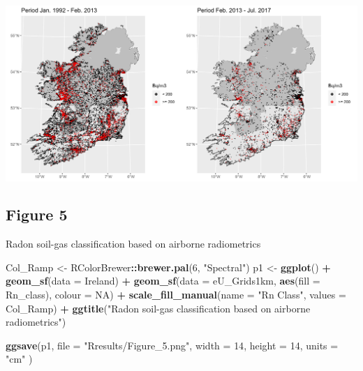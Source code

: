 \documentclass[
  12pt,
]{article}
\newenvironment{Shaded}{\begin{snugshade}}{\end{snugshade}}
\newcommand{\DataTypeTok}[1]{\textcolor[rgb]{0.13,0.29,0.53}{#1}}
\newcommand{\DecValTok}[1]{\textcolor[rgb]{0.00,0.00,0.81}{#1}}
\newcommand{\KeywordTok}[1]{\textcolor[rgb]{0.13,0.29,0.53}{\textbf{#1}}}
\newcommand{\NormalTok}[1]{#1}
\newcommand{\OperatorTok}[1]{\textcolor[rgb]{0.81,0.36,0.00}{\textbf{#1}}}
\newcommand{\OtherTok}[1]{\textcolor[rgb]{0.56,0.35,0.01}{#1}}
\newcommand{\StringTok}[1]{\textcolor[rgb]{0.31,0.60,0.02}{#1}}
\begin{document}
\begin{center}\includegraphics[width=0.85\linewidth]{Rresults/Figure_4} \end{center}

\hypertarget{figure-5}{%
\subsection{Figure 5}\label{figure-5}}

Radon soil-gas classification based on airborne radiometrics

\begin{Shaded}
\begin{Highlighting}[]
\NormalTok{  Col\_Ramp \textless{}{-}}\StringTok{ }\NormalTok{RColorBrewer}\OperatorTok{::}\KeywordTok{brewer.pal}\NormalTok{(}\DecValTok{6}\NormalTok{, }\StringTok{"Spectral"}\NormalTok{)}
\NormalTok{  p1 \textless{}{-}}\StringTok{ }\KeywordTok{ggplot}\NormalTok{() }\OperatorTok{+}\StringTok{ }
\StringTok{    }\KeywordTok{geom\_sf}\NormalTok{(}\DataTypeTok{data =}\NormalTok{ Ireland) }\OperatorTok{+}
\StringTok{    }\KeywordTok{geom\_sf}\NormalTok{(}\DataTypeTok{data =}\NormalTok{ eU\_Grids1km, }\KeywordTok{aes}\NormalTok{(}\DataTypeTok{fill =}\NormalTok{ Rn\_class), }\DataTypeTok{colour =} \OtherTok{NA}\NormalTok{) }\OperatorTok{+}
\StringTok{    }\KeywordTok{scale\_fill\_manual}\NormalTok{(}\DataTypeTok{name =} \StringTok{"Rn Class"}\NormalTok{,}
                      \DataTypeTok{values =}\NormalTok{ Col\_Ramp) }\OperatorTok{+}
\StringTok{    }\KeywordTok{ggtitle}\NormalTok{(}\StringTok{"Radon soil{-}gas classification based on airborne radiometrics"}\NormalTok{) }
 
  \KeywordTok{ggsave}\NormalTok{(p1,}
         \DataTypeTok{file =} \StringTok{"Rresults/Figure\_5.png"}\NormalTok{,}
         \DataTypeTok{width =} \DecValTok{14}\NormalTok{,}
         \DataTypeTok{height =} \DecValTok{14}\NormalTok{,}
         \DataTypeTok{units =} \StringTok{"cm"}\NormalTok{ )}
\end{Highlighting}
\end{Shaded}
\end{document}
